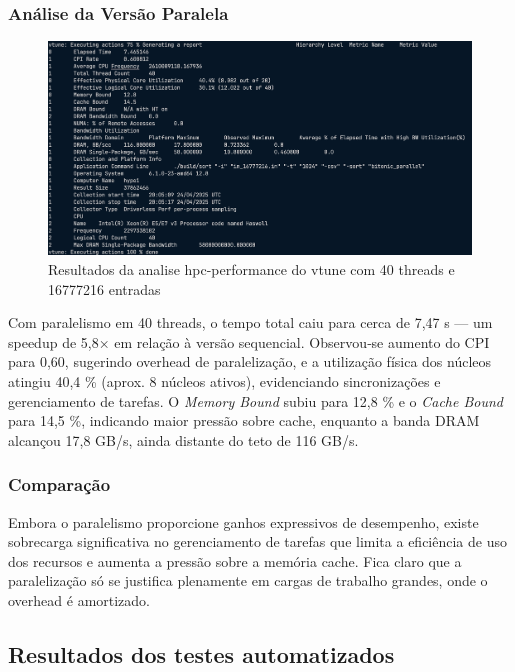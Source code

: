 \documentclass{article}
\begin{document}
\subsubsection{Análise da Versão Paralela}

\begin{figure}[H]
    \centering
    \includegraphics[width=0.8\linewidth]{images/vtune_parallel.png}
    \caption{Resultados da analise hpc-performance do vtune com 40 threads e 16777216 entradas}
    \label{fig:vtune_parallel}
\end{figure}

Com paralelismo em 40 threads, o tempo total caiu para cerca de 7,47 s — um speedup de 5,8× em relação à versão sequencial. Observou‐se aumento do CPI para 0,60, sugerindo overhead de paralelização, e a utilização física dos núcleos atingiu 40,4 \% (aprox. 8 núcleos ativos), evidenciando sincronizações e gerenciamento de tarefas. O \emph{Memory Bound} subiu para 12,8 \% e o \emph{Cache Bound} para 14,5 \%, indicando maior pressão sobre cache, enquanto a banda DRAM alcançou 17,8 GB/s, ainda distante do teto de 116 GB/s.

\subsubsection{Comparação}

Embora o paralelismo proporcione ganhos expressivos de desempenho, existe sobrecarga significativa no gerenciamento de tarefas que limita a eficiência de uso dos recursos e aumenta a pressão sobre a memória cache. Fica claro que a paralelização só se justifica plenamente em cargas de trabalho grandes, onde o overhead é amortizado.

\subsection{Resultados dos testes automatizados}
\end{document}
